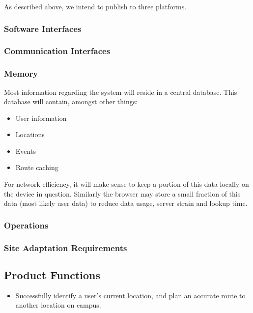 \documentclass[10pt,a4paper]{article}
\begin{document}
				As described above, we intend to publish to three platforms.

			\subsubsection{Software Interfaces}



			\subsubsection{Communication Interfaces}

			\subsubsection{Memory}

				Most information regarding the system will reside in a central
				database. This database will contain, amongst other things:

				\begin{itemize}
					\item User information
					\item Locations
					\item Events
					\item Route caching
				\end{itemize}

				For network efficiency, it will make sense to keep a portion of this
				data locally on the device in question. Similarly the browser may store
				a small fraction of this data (most likely user data) to reduce data
				usage, server strain and lookup time.

			\subsubsection{Operations}



			\subsubsection{Site Adaptation Requirements}

		\subsection{Product Functions}

			\begin{itemize}
				\item Successfully identify a user's current location, and plan an
							accurate route to another location on campus.
			\end{itemize}
\end{document}
